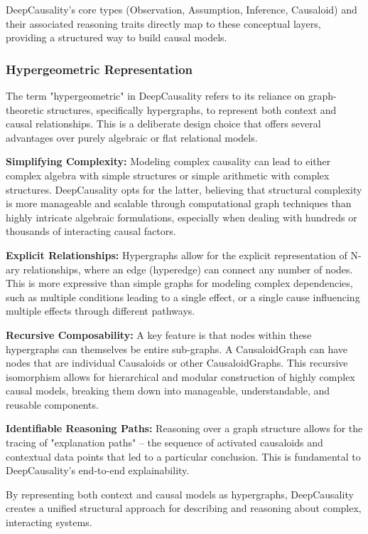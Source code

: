DeepCausality's core types (Observation, Assumption, Inference, Causaloid) and their associated reasoning traits directly map to these conceptual layers, providing a structured way to build causal models.

\subsubsection{Hypergeometric Representation}

The term "hypergeometric" in DeepCausality refers to its reliance on graph-theoretic structures, specifically hypergraphs, to represent both context and causal relationships. This is a deliberate design choice that offers several advantages over purely algebraic or flat relational models.

\textbf{Simplifying Complexity:} Modeling complex causality can lead to either complex algebra with simple structures or simple arithmetic with complex structures. DeepCausality opts for the latter, believing that structural complexity is more manageable and scalable through computational graph techniques than highly intricate algebraic formulations, especially when dealing with hundreds or thousands of interacting causal factors.

\textbf{Explicit Relationships:} Hypergraphs allow for the explicit representation of N-ary relationships, where an edge (hyperedge) can connect any number of nodes. This is more expressive than simple graphs for modeling complex dependencies, such as multiple conditions leading to a single effect, or a single cause influencing multiple effects through different pathways.

\textbf{Recursive Composability:} A key feature is that nodes within these hypergraphs can themselves be entire sub-graphs. A CausaloidGraph can have nodes that are individual Causaloids or other CausaloidGraphs. This recursive isomorphism allows for hierarchical and modular construction of highly complex causal models, breaking them down into manageable, understandable, and reusable components.

\textbf{Identifiable Reasoning Paths:} Reasoning over a graph structure allows for the tracing of "explanation paths" – the sequence of activated causaloids and contextual data points that led to a particular conclusion. This is fundamental to DeepCausality's end-to-end explainability.

By representing both context and causal models as hypergraphs, DeepCausality creates a unified structural approach for describing and reasoning about complex, interacting systems.

